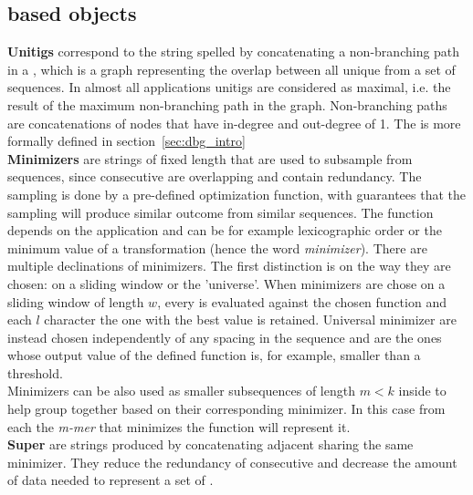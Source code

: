 \subsection{\kmer based objects}
\label{sec:kmerobjects}
\textbf{Unitigs} correspond to the string spelled by concatenating a non-branching path in a \dbg, which is a graph representing the overlap between all unique \kmers from a set of sequences. In almost all applications unitigs are considered as maximal, i.e. the result of the maximum non-branching path in the graph. Non-branching paths are concatenations of nodes that have in-degree and out-degree of 1. The \dbg is more formally defined in section~\ref{sec:dbg_intro} \\
\textbf{Minimizers} are strings of fixed length that are used to subsample \kmers from sequences, since consecutive \kmers are overlapping and contain redundancy. The sampling is done by a pre-defined optimization function, with guarantees that the sampling will produce similar outcome from similar sequences. The function depends on the application and can be for example lexicographic order or the minimum value of a transformation (hence the word \emph{minimizer}). There are multiple declinations of minimizers. The first distinction is on the way they are chosen: on a sliding window or the 'universe'. When minimizers are chose on a sliding window of length $w$, every \kmer is evaluated against the chosen function and each $l$ character the one with the best value is retained. Universal minimizer are instead chosen independently of any spacing in the sequence and are the ones whose output value of the defined function is, for example, smaller than a threshold. \\
Minimizers can be also used as smaller subsequences of length $m < k$ inside \kmers to help group together \kmers based on their corresponding minimizer. In this case from each \kmer the \emph{m-mer} that minimizes the function will represent it. \\
\textbf{Super\kmers} are strings produced by concatenating adjacent \kmers sharing the same minimizer. They reduce the redundancy of consecutive \kmers and decrease the amount of data needed to represent a set of \kmers. 
